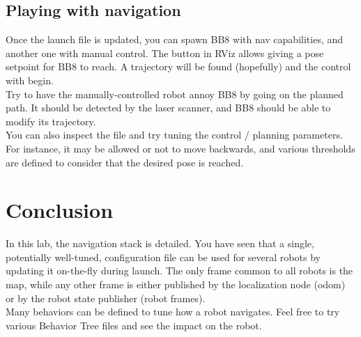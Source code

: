\documentclass{ecnreport}
\begin{document}
\subsection{Playing with navigation}

Once the launch file is updated, you can spawn BB8 with nav capabilities, and another one with manual control. The  button in RViz allows giving a pose setpoint for BB8 to reach. A trajectory will be found (hopefully) and the control with begin.\\

Try to have the manually-controlled robot annoy BB8 by going on the planned path. It should be detected by the laser scanner, and BB8 should be able to modify its trajectory.\\

You can also inspect the  file and try tuning the control / planning parameters. For instance, it may be allowed or not to move backwards, and various thresholds are defined to consider that the desired pose is reached.


\section{Conclusion}

In this lab, the navigation stack is detailed. You have seen that a single, potentially well-tuned, configuration file can be used for several robots by updating it on-the-fly during launch. The only frame common to all robots is the map, while any other frame is either published by the localization node (odom) or by the robot state publisher (robot frames). \\

Many behaviors can be defined to tune how a robot navigates. Feel free to try various Behavior Tree files and see the impact on the robot.
\end{document}
